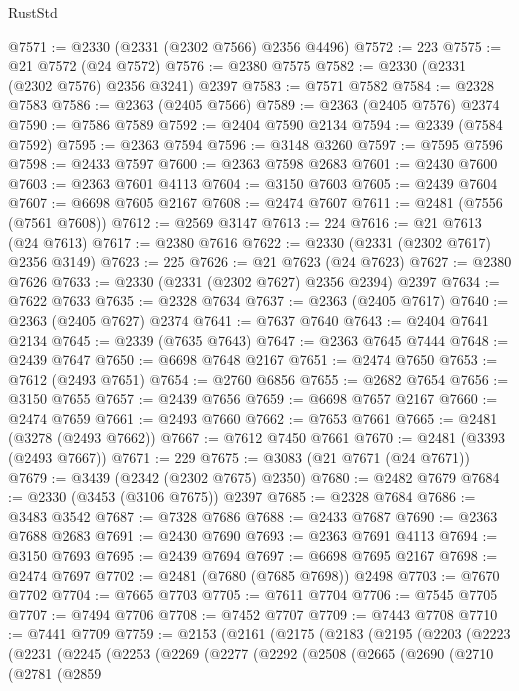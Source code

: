 \begin{lexlean}{RustStd}
\begin{coremodule}
@7571 := @2330 (@2331 (@2302 @7566) @2356 @4496)
@7572 := 223
@7575 := @21 @7572 (@24 @7572)
@7576 := @2380 @7575
@7582 := @2330 (@2331 (@2302 @7576) @2356 @3241) @2397
@7583 := @7571 @7582
@7584 := @2328 @7583
@7586 := @2363 (@2405 @7566)
@7589 := @2363 (@2405 @7576) @2374
@7590 := @7586 @7589
@7592 := @2404 @7590 @2134
@7594 := @2339 (@7584 @7592)
@7595 := @2363 @7594
@7596 := @3148 @3260
@7597 := @7595 @7596
@7598 := @2433 @7597
@7600 := @2363 @7598 @2683
@7601 := @2430 @7600
@7603 := @2363 @7601 @4113
@7604 := @3150 @7603
@7605 := @2439 @7604
@7607 := @6698 @7605 @2167
@7608 := @2474 @7607
@7611 := @2481 (@7556 (@7561 @7608))
@7612 := @2569 @3147
@7613 := 224
@7616 := @21 @7613 (@24 @7613)
@7617 := @2380 @7616
@7622 := @2330 (@2331 (@2302 @7617) @2356 @3149)
@7623 := 225
@7626 := @21 @7623 (@24 @7623)
@7627 := @2380 @7626
@7633 := @2330 (@2331 (@2302 @7627) @2356 @2394) @2397
@7634 := @7622 @7633
@7635 := @2328 @7634
@7637 := @2363 (@2405 @7617)
@7640 := @2363 (@2405 @7627) @2374
@7641 := @7637 @7640
@7643 := @2404 @7641 @2134
@7645 := @2339 (@7635 @7643)
@7647 := @2363 @7645 @7444
@7648 := @2439 @7647
@7650 := @6698 @7648 @2167
@7651 := @2474 @7650
@7653 := @7612 (@2493 @7651)
@7654 := @2760 @6856
@7655 := @2682 @7654
@7656 := @3150 @7655
@7657 := @2439 @7656
@7659 := @6698 @7657 @2167
@7660 := @2474 @7659
@7661 := @2493 @7660
@7662 := @7653 @7661
@7665 := @2481 (@3278 (@2493 @7662))
@7667 := @7612 @7450 @7661
@7670 := @2481 (@3393 (@2493 @7667))
@7671 := 229
@7675 := @3083 (@21 @7671 (@24 @7671))
@7679 := @3439 (@2342 (@2302 @7675) @2350)
@7680 := @2482 @7679
@7684 := @2330 (@3453 (@3106 @7675)) @2397
@7685 := @2328 @7684
@7686 := @3483 @3542
@7687 := @7328 @7686
@7688 := @2433 @7687
@7690 := @2363 @7688 @2683
@7691 := @2430 @7690
@7693 := @2363 @7691 @4113
@7694 := @3150 @7693
@7695 := @2439 @7694
@7697 := @6698 @7695 @2167
@7698 := @2474 @7697
@7702 := @2481 (@7680 (@7685 @7698)) @2498
@7703 := @7670 @7702
@7704 := @7665 @7703
@7705 := @7611 @7704
@7706 := @7545 @7705
@7707 := @7494 @7706
@7708 := @7452 @7707
@7709 := @7443 @7708
@7710 := @7441 @7709
@7759 := @2153
    (@2161
      (@2175
        (@2183
          (@2195
            (@2203
              (@2223
                (@2231
                  (@2245
                    (@2253
                      (@2269
                        (@2277
                          (@2292
                            (@2508
                              (@2665
                                (@2690
                                  (@2710
                                    (@2781
                                      (@2859

\end{coremodule}
\end{lexlean}

